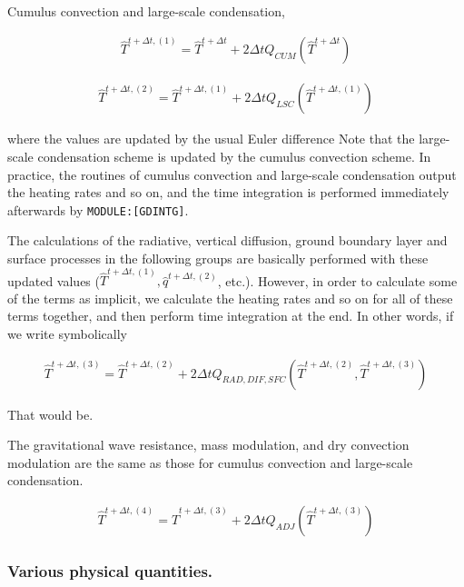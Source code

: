 Cumulus convection and large-scale condensation,

\begin{eqnarray}
  \hat{T}^{t+\Delta t,(1)} = \hat{T}^{t+\Delta t}
                         +  2 \Delta t Q_{CUM}(\hat{T}^{t+\Delta t})
\end{eqnarray}

\begin{eqnarray}
  \hat{T}^{t+\Delta t,(2)} = \hat{T}^{t+\Delta t,(1)}
                         +  2 \Delta t Q_{LSC}(\hat{T}^{t+\Delta t,(1)})
\end{eqnarray}

where the values are updated by the usual Euler difference Note that the
large-scale condensation scheme is updated by the cumulus convection
scheme. In practice, the routines of cumulus convection and large-scale
condensation output the heating rates and so on, and the time
integration is performed immediately afterwards by
\texttt{MODULE:{[}GDINTG{]}}.

The calculations of the radiative, vertical diffusion, ground boundary
layer and surface processes in the following groups are basically
performed with these updated values
(\(\hat{T}^{t+\Delta t,(1)}, \hat{q}^{t+\Delta t,(2)}\), etc.). However,
in order to calculate some of the terms as implicit, we calculate the
heating rates and so on for all of these terms together, and then
perform time integration at the end. In other words, if we write
symbolically

\begin{eqnarray}
  \hat{T}^{t+\Delta t,(3)} = \hat{T}^{t+\Delta t,(2)}
              + 2 \Delta t Q_{RAD,DIF,SFC}
               (\hat{T}^{t+\Delta t,(2)},\hat{T}^{t+\Delta t,(3)})
\end{eqnarray}

That would be.

The gravitational wave resistance, mass modulation, and dry convection
modulation are the same as those for cumulus convection and large-scale
condensation.

\begin{eqnarray}
  \hat{T}^{t+\Delta t,(4)} = \hat{T}^{t+\Delta t,(3)}
              +  2 \Delta t Q_{ADJ}(\hat{T}^{t+\Delta t,(3)})
\end{eqnarray}

\hypertarget{various-physical-quantities.}{%
\subsubsection{Various physical
quantities.}\label{various-physical-quantities.}}

